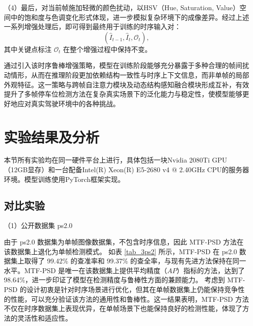 （4）最后，对当前帧施加轻微的颜色扰动，以HSV（Hue, Saturation, Value）空间中的饱和度与色调变化形式体现，进一步模拟复杂环境下的成像差异。经过上述一系列增强处理后，即可得到最终用于训练的时序输入对：
\begin{equation}
(\hat{I}_{t-1}, \hat{I}_{t}, \mathcal{O}_t),
\end{equation}
其中关键点标注 $\mathcal{O}_t$ 在整个增强过程中保持不变。

通过引入该时序鲁棒增强策略，模型在训练阶段能够充分暴露于多种合理的帧间扰动情形，从而在推理阶段更加依赖结构一致性与时序上下文信息，而非单帧的局部外观特征。这一策略与跨帧自注意力模块及动态结构感知融合模块形成互补，有效提升了多帧停车位检测方法在复杂真实场景下的泛化能力与稳定性，使模型能够更好地应对真实驾驶环境中的各种挑战。


\section{实验结果及分析}

本节所有实验均在同一硬件平台上进行，具体包括一块Nvidia 2080Ti GPU（12GB显存）和一台配备Intel(R) Xeon(R) E5-2680 v4 @ 2.40GHz CPU的服务器环境。模型训练使用PyTorch框架实现。

\subsection{对比实验}

（1）公开数据集 ps2.0

由于 ps2.0 数据集为单帧图像数据集，不包含时序信息，因此 MTF-PSD 方法在该数据集上退化为单帧检测模式。
如表 \ref{tab_3ps2} 所示，MTF-PSD 在 ps2.0 数据集上取得了 99.42\% 的查准率和 99.37\% 的查全率，与现有先进方法保持在同一水平。MTF-PSD 是唯一在该数据集上提供平均精度（$AP$）指标的方法，达到了 98.64\%，进一步印证了模型在检测精度与鲁棒性方面的兼顾能力。
考虑到 MTF-PSD 的设计初衷是针对时序场景进行优化，但其在单帧数据集上仍能保持竞争性的性能，可以充分验证该方法的通用性和鲁棒性。这一结果表明，MTF-PSD 方法不仅在时序数据集上表现优异，在单帧场景下也能保持良好的检测性能，体现了方法的灵活性和适应性。


